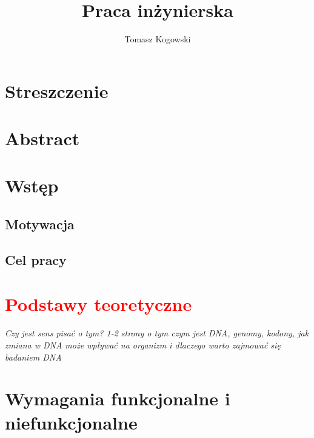\documentclass[a4paper,12pt,twoside]{article}
\title{Praca inżynierska}
\author{Tomasz Kogowski}
\begin{document}

\newpage 
\section*{Streszczenie}
\newpage 
\section*{Abstract}

\newpage

\newpage
\tableofcontents
 
\newpage
\section{Wstęp}  





\subsection{Motywacja}  

\subsection{Cel pracy} 
\newpage
\section{\textcolor{red}{Podstawy teoretyczne}}  

\textit{Czy jest sens pisać o tym? 
1-2 strony o tym czym jest DNA, genomy, kodony, jak zmiana w DNA może wpływać na organizm i dlaczego warto zajmować się badaniem DNA}
\newpage
\section{Wymagania funkcjonalne i niefunkcjonalne}  
\end{document}
